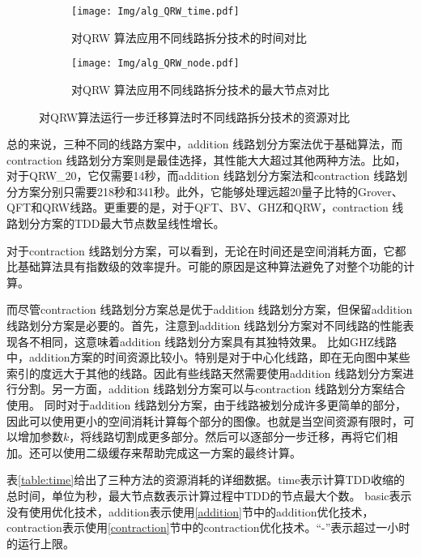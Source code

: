 \begin{figure}[!htbp]
    \centering
    \begin{subfigure}[b]{.45\textwidth}
        \centering
        \texttt{[image: Img/alg\_QRW\_time.pdf]}
        \caption{对QRW 算法应用不同线路拆分技术的时间对比}
        \label{fig:QRW-time}
    \end{subfigure}
    \qquad
    \begin{subfigure}[b]{.45\textwidth}
        \centering
        \texttt{[image: Img/alg\_QRW\_node.pdf]}
        \caption{对QRW 算法应用不同线路拆分技术的最大节点对比}
        \label{fig:QRW-node}
    \end{subfigure}
    \caption{对QRW算法运行一步迁移算法时不同线路拆分技术的资源对比}
    \label{fig:QRW-compare}
\end{figure}

总的来说，三种不同的线路方案中，addition 线路划分方案法优于基础算法，而contraction 线路划分方案则是最佳选择，其性能大大超过其他两种方法。比如，对于QRW\_20，它仅需要14秒，而addition 线路划分方案法和contraction 线路划分方案分别只需要218秒和341秒。此外，它能够处理远超20量子比特的Grover、QFT和QRW线路。更重要的是，对于QFT、BV、GHZ和QRW，contraction 线路划分方案的TDD最大节点数呈线性增长。

对于contraction 线路划分方案，可以看到，无论在时间还是空间消耗方面，它都比基础算法具有指数级的效率提升。可能的原因是这种算法避免了对整个功能的计算。

而尽管contraction 线路划分方案总是优于addition 线路划分方案，但保留addition 线路划分方案是必要的。首先，注意到addition 线路划分方案对不同线路的性能表现各不相同，这意味着addition 线路划分方案具有其独特效果。
比如GHZ线路中，addition方案的时间资源比较小。特别是对于中心化线路，即在无向图中某些索引的度远大于其他的线路。因此有些线路天然需要使用addition 线路划分方案进行分割。另一方面，addition 线路划分方案可以与contraction 线路划分方案结合使用。
同时对于addition 线路划分方案，由于线路被划分成许多更简单的部分，因此可以使用更小的空间消耗计算每个部分的图像。也就是当空间资源有限时，可以增加参数$k$，将线路切割成更多部分。然后可以逐部分一步迁移，再将它们相加。还可以使用二级缓存来帮助完成这一方案的最终计算。

表\ref{table:time}给出了三种方法的资源消耗的详细数据。time表示计算TDD收缩的总时间，单位为秒，最大节点数表示计算过程中TDD的节点最大个数。
basic表示没有使用优化技术，addition表示使用\ref{addition}节中的addition优化技术，contraction表示使用\ref{contraction}节中的contraction优化技术。“-”表示超过一小时的运行上限。

